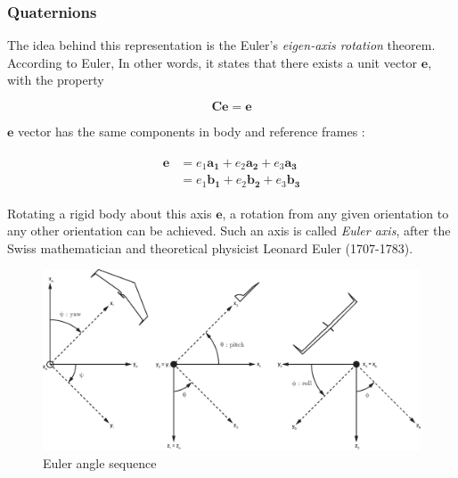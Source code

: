 \subsubsection{Quaternions}

The idea behind this representation is the Euler's \emph{eigen-axis rotation} theorem. 
According to Euler,  In other words, it states that there exists a unit vector $\bm{e}$, with the property

\begin{equation}
\label{eqn:quat1}
\bm{C}\bm{e}= \bm{e}
\end{equation}

$\bm{e}$ vector has the same components in body and reference frames :

\begin{align}
\label{eqn:quat2}
\begin{split}
\bm{e} & = e_1 \bm{a_1} + e_2 \bm{a_2} + e_3 \bm{a_3}
\\
& = e_1 \bm{b_1} + e_2 \bm{b_2} + e_3 \bm{b_3}
\end{split}
\end{align}
 
Rotating a rigid body about this axis $\bm{e}$, a rotation from any given orientation to any other orientation can be achieved. 
Such an axis is called  \emph{Euler axis}, after the Swiss mathematician and theoretical physicist Leonard Euler (1707-1783).

\begin{landscape}
\begin{figure}
\begin{center}
\includegraphics[width=23cm]{figures/ZagiEulerAngleSequence}
\caption{Euler angle sequence \cite{ducard2009fault}} 
\label{fig:eulerAngSequence}
\end{center}
\end{figure}
\end{landscape}

